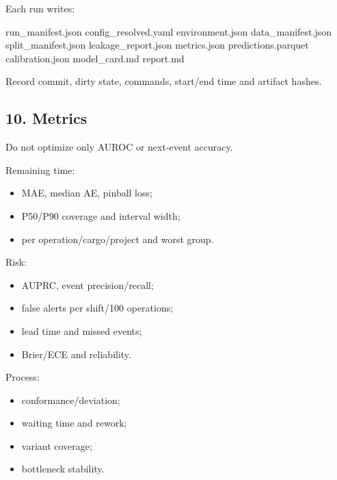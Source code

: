 \documentclass[
  spanish,
  10pt,
  a4paper,
]{article}
\newenvironment{Shaded}{}{}
\newcommand{\NormalTok}[1]{#1}
\providecommand{\tightlist}{%
  \setlength{\itemsep}{0pt}\setlength{\parskip}{0pt}}
\begin{document}
Each run writes:

\begin{Shaded}
\begin{Highlighting}[]
\NormalTok{run\_manifest.json}
\NormalTok{config\_resolved.yaml}
\NormalTok{environment.json}
\NormalTok{data\_manifest.json}
\NormalTok{split\_manifest.json}
\NormalTok{leakage\_report.json}
\NormalTok{metrics.json}
\NormalTok{predictions.parquet}
\NormalTok{calibration.json}
\NormalTok{model\_card.md}
\NormalTok{report.md}
\end{Highlighting}
\end{Shaded}

Record commit, dirty state, commands, start/end time and artifact
hashes.

\subsection{10. Metrics}\label{10-metrics}

Do not optimize only AUROC or next-event accuracy.

Remaining time:

\begin{itemize}
\tightlist
\item
  MAE, median AE, pinball loss;
\item
  P50/P90 coverage and interval width;
\item
  per operation/cargo/project and worst group.
\end{itemize}

Risk:

\begin{itemize}
\tightlist
\item
  AUPRC, event precision/recall;
\item
  false alerts per shift/100 operations;
\item
  lead time and missed events;
\item
  Brier/ECE and reliability.
\end{itemize}

Process:

\begin{itemize}
\tightlist
\item
  conformance/deviation;
\item
  waiting time and rework;
\item
  variant coverage;
\item
  bottleneck stability.
\end{itemize}
\end{document}
